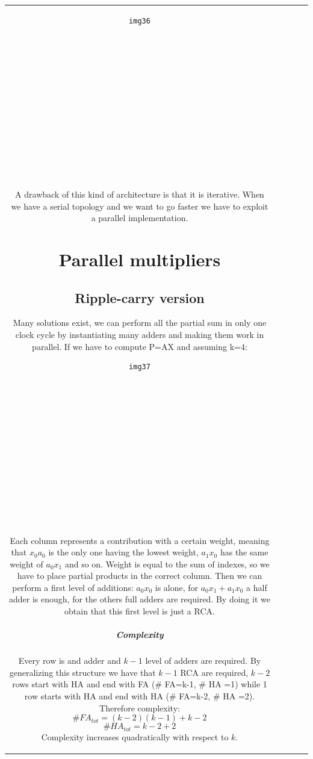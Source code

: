 \begin{center}
\begin{tabular}{|c|c|c|c|c|}
\begin{verbatim}
img36














\end{verbatim}

A drawback of this kind of architecture is that it is iterative. When we have a serial topology and we want to go faster we have to exploit a parallel implementation.

\section{Parallel multipliers}

\subsection{Ripple-carry version}
Many solutions exist, we can perform all the partial sum in only one clock cycle by instantiating many adders and making them work in parallel. If we have to compute P=AX and assuming k=4:
\begin{verbatim}
img37














\end{verbatim}

Each column represents a contribution with a certain weight, meaning that $x_0a_0$ is the only one having the lowest weight, $a_1x_0$ has the same weight of $a_0x_1$ and so on. Weight is equal to the sum of indexes, so we have to place partial products in the correct column. Then we can perform a first level of additions: $a_0x_0$ is alone, for $a_0x_1+a_1x_0$ a half adder is enough, for the others full adders are required. By doing it we obtain that this first level is just a RCA.

\subparagraph{Complexity}
Every row is and adder and $k-1$ level of adders are required. By generalizing this structure we have that $k-1$ RCA are required, $k-2$ rows start with HA and end with FA (\# FA=k-1, \# HA =1) while 1 row starts with HA and end with HA (\# FA=k-2, \# HA =2). Therefore complexity:
$$  \#FA_{tot} = (k-2)(k-1)+k-2$$
$$  \#HA_{tot} = k-2+2$$
Complexity increases quadratically with respect to $k$.


\end{tabular}
\end{center}
